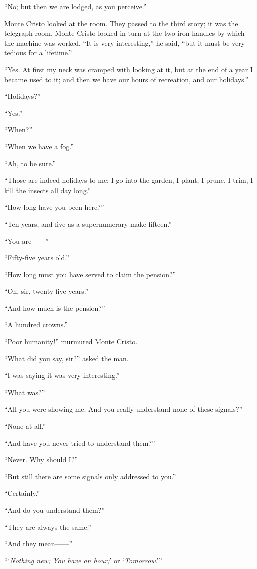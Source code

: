 “No; but then we are lodged, as you perceive.”

Monte Cristo looked at the room. They passed to the third story; it was
the telegraph room. Monte Cristo looked in turn at the two iron handles
by which the machine was worked. “It is very interesting,” he said,
“but it must be very tedious for a lifetime.”

“Yes. At first my neck was cramped with looking at it, but at the end
of a year I became used to it; and then we have our hours of
recreation, and our holidays.”

“Holidays?”

“Yes.”

“When?”

“When we have a fog.”

“Ah, to be sure.”

“Those are indeed holidays to me; I go into the garden, I plant, I
prune, I trim, I kill the insects all day long.”

“How long have you been here?”

“Ten years, and five as a supernumerary make fifteen.”

“You are——”

“Fifty-five years old.”

“How long must you have served to claim the pension?”

“Oh, sir, twenty-five years.”

“And how much is the pension?”

“A hundred crowns.”

“Poor humanity!” murmured Monte Cristo.

“What did you say, sir?” asked the man.

“I was saying it was very interesting.”

“What was?”

“All you were showing me. And you really understand none of these
signals?”

“None at all.”

“And have you never tried to understand them?”

“Never. Why should I?”

“But still there are some signals only addressed to you.”

“Certainly.”

“And do you understand them?”

“They are always the same.”

“And they mean——”

“‘\textit{Nothing new; You have an hour;}’ or ‘\textit{Tomorrow}.’”

